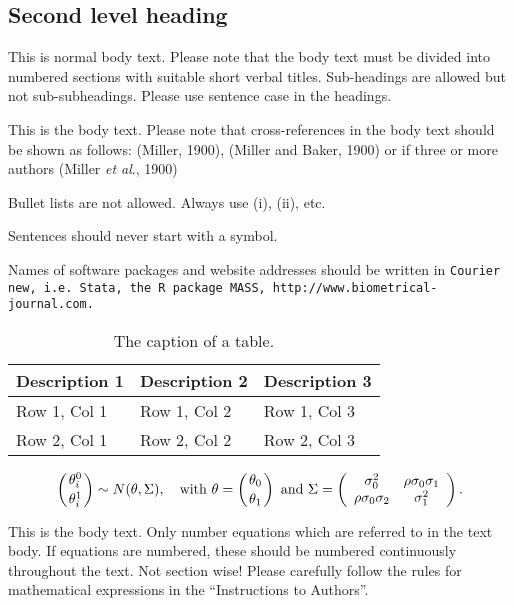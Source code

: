 \documentclass[bimj,fleqn]{w-art}\usepackage[]{graphicx}\usepackage[]{color}
\theoremstyle{plain}
\theoremstyle{definition}
\begin{document}
  \subsection{Second level heading}
  This is normal body text. Please note that the body text must be divided into numbered sections with
  suitable short verbal titles. Sub-headings are allowed but not sub-subheadings. Please use sentence case in the
  headings.

  This is the body text. Please note that cross-references in the body text should be shown as follows:
  (Miller, 1900), (Miller and Baker, 1900) or if three or more authors (Miller {\it{et al}}., 1900)
  \vspace*{12pt}

  \noindent Bullet lists are not allowed. Always use (i), (ii), etc.
  \vspace*{12pt}

  \noindent Sentences should never start with a symbol.
  \vspace*{12pt}

  \noindent Names of software packages and website addresses should be written in {\tt{Courier new, i.e. Stata, the R package
  MASS, http://www.biometrical-journal.com.}}


  \begin{table}[htb]
  \begin{center}
  \caption{The caption of a table.}
  \begin{tabular}{lll}
  \hline
  Description 1 & Description 2 & Description 3\\
  \hline
  Row 1, Col 1 & Row 1, Col 2 & Row 1, Col 3\\
  Row 2, Col 1 & Row 2, Col 2 & Row 2, Col 3\\
  \hline
  \end{tabular}
  \end{center}
  \end{table}
  \begin{equation}
  \left({\theta^{0}_{i}}\atop{\theta^{1}_{i}}\right) \sim N(\theta,\Sigma),\quad {\mathrm{with}}\
  {{\theta}} = \left({\theta_{0}}\atop{\theta_{1}}\right)\ {\mathrm{and}}\ \Sigma =
  \left(\begin{array}{cc}
  \sigma^{2}_{0} & \rho\sigma_{0}\sigma_{1}\\
  \rho\sigma_{0}\sigma_{2} & \sigma^{2}_{1}
  \end{array}\right).
  \end{equation}

  \noindent This is the body text. Only number equations which are referred to in the text body. If equations
  are numbered, these should be numbered continuously throughout the text. Not section wise! Please
  carefully follow the rules for mathematical expressions in the ``Instructions to Authors''.
\end{document}
